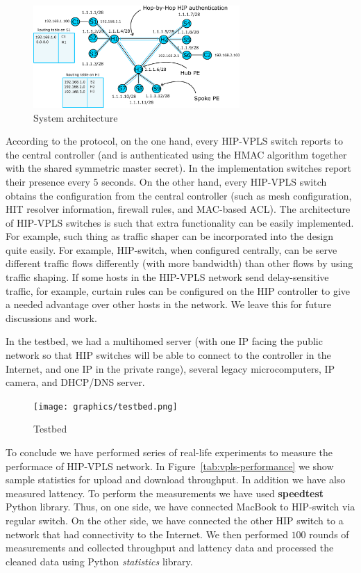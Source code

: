 \begin{figure}[h!]
\centering
\includegraphics[width=0.7\textwidth]{graphics/arch.png}
\caption{System architecture}
\label{fig:architecture}
\end{figure} 

According to the protocol, on the one hand, every HIP-VPLS 
switch reports to the central controller (and is authenticated 
using the HMAC algorithm together with the shared symmetric 
master secret). In the implementation switches report their presence every $5$ 
seconds. On the other hand, every HIP-VPLS switch obtains 
the configuration from the central controller (such as mesh 
configuration, HIT resolver information, firewall rules, and 
MAC-based ACL). The architecture of HIP-VPLS switches is such
that extra functionality can be easily implemented. For example,
such thing as traffic shaper can be incorporated into the design
quite easily. For example, HIP-switch, when configured centrally, 
can be serve different traffic flows differently (with more bandwidth) than other 
flows by using traffic shaping. If some hosts in the HIP-VPLS network send delay-sensitive traffic, 
for example, curtain rules can be configured on the HIP controller 
to give a needed advantage over other hosts in the network. We 
leave this for future discussions and work.

In the testbed, we had a multihomed server (with one IP facing 
the public network so that HIP switches will be able to connect to 
the controller in the Internet, and one IP in the private range), 
several legacy microcomputers, IP camera, and DHCP/DNS server.

\begin{figure}[h!]
    \centering
    \texttt{[image: graphics/testbed.png]}
    \caption{Testbed}
    \label{fig:testbed}
\end{figure}

To conclude we have performed series of real-life experiments to measure the 
performace of HIP-VPLS network. In Figure~\ref{tab:vpls-performance} we show
sample statistics for upload and download throughput. In addition we have also
measured lattency. To perform the measurements we have used {\bf speedtest}
Python library. Thus, on one side, we have connected MacBook to HIP-switch via regular
switch. On the other side, we have connected the other HIP switch to a network 
that had connectivity to the Internet. We then performed $100$ rounds of measurements
and collected throughput and lattency data and processed the cleaned data using Python
{\it statistics} library.

